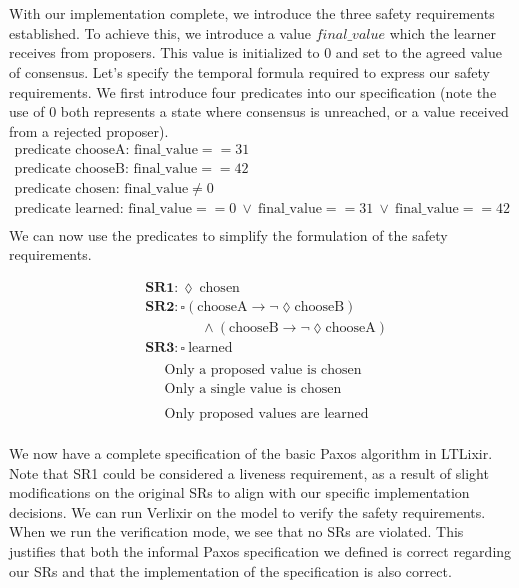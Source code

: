 \\ \\
With our implementation complete, we introduce the three safety requirements established. To achieve this, we introduce a value $final\_value$ which the learner receives from proposers. This value is initialized to $0$ and set to the agreed value of consensus. Let's specify the temporal formula required to express our safety requirements. We first introduce four predicates into our specification (note the use of $0$ both represents a state where consensus is unreached, or a value received from a rejected proposer).
\[
\begin{array}{l}
\text{predicate chooseA: final\_value} == 31 \\
\text{predicate chooseB: final\_value} == 42 \\
\text{predicate chosen: final\_value} \neq 0 \\
\text{predicate learned: final\_value} == 0 \ \lor \ \text{final\_value} == 31 \ \lor \ \text{final\_value} == 42 \\
\end{array}
\]
We can now use the predicates to simplify the formulation of the safety requirements.
\begin{multicols}{2}
    \[
    \begin{aligned}
    &\textbf{SR1}: \lozenge \ \text{chosen} \\
    &\textbf{SR2}: \square \left( \text{chooseA} \rightarrow \neg \lozenge \text{chooseB} \right) \\ 
    &\quad \quad \quad \quad \land \left( \text{chooseB} \rightarrow \neg \lozenge \text{chooseA} \right) \\
    &\textbf{SR3}: \square \ \text{learned} \\
    \end{aligned}
    \]
    \vline
    \[
    \begin{aligned}
    &\text{Only a proposed value is chosen} \\
    &\text{Only a single value is chosen} \\
    & \\
    &\text{Only proposed values are learned} \\
    \end{aligned}
    \]
\end{multicols}
We now have a complete specification of the basic Paxos algorithm in LTLixir. Note that SR1 could be considered a liveness requirement, as a result of slight modifications on the original SRs to align with our specific implementation decisions. We can run Verlixir on the model to verify the safety requirements. When we run the verification mode, we see that no SRs are violated. This justifies that both the informal Paxos specification we defined is correct regarding our SRs and that the implementation of the specification is also correct.
